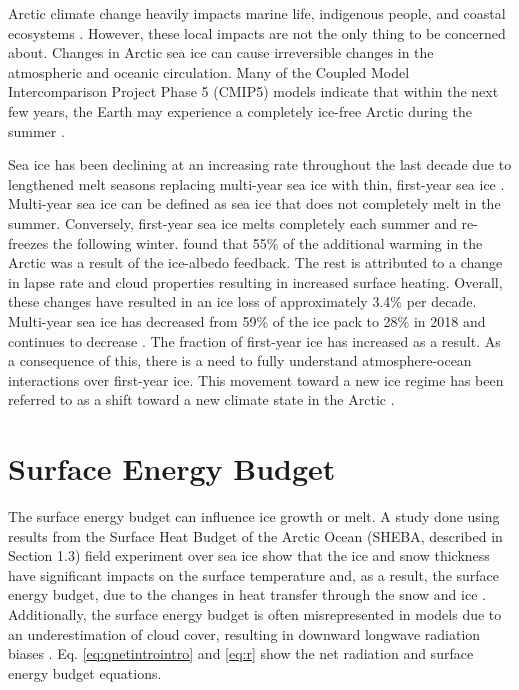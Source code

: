 Arctic climate change heavily impacts marine life, indigenous people, and coastal ecosystems \citep{ipcc_techsum}. However, these local impacts are not the only thing to be concerned about. Changes in Arctic sea ice can cause irreversible changes in the atmospheric and oceanic circulation. Many of the Coupled Model Intercomparison Project Phase 5 (CMIP5) models indicate that within the next few years, the Earth may experience a completely ice-free Arctic during the summer \citep{stroeve:2018}.

Sea ice has been declining at an increasing rate throughout the last decade due to lengthened melt seasons replacing multi-year sea ice  with thin, first-year sea ice \citep{meier:2014}. Multi-year sea ice can be defined as sea ice that does not completely melt in the summer. Conversely, first-year sea ice melts completely each summer and re-freezes the following winter. \citet{wunderling:2020} found that 55$\%$ of the additional warming in the Arctic was a result of the ice-albedo feedback. The rest is attributed to a change in lapse rate and cloud properties resulting in increased surface heating. Overall, these changes have resulted in an ice loss of approximately 3.4$\%$ per decade. Multi-year sea ice has decreased from 59$\%$ of the ice pack to 28$\%$ in 2018 and continues to decrease \citep{stroeve:2018}. The fraction of first-year ice has increased as a result. As a consequence of this, there is a need to fully understand atmosphere-ocean interactions over first-year ice. This movement toward a new ice regime has been referred to as a shift toward a new climate state in the Arctic \citep{verlinde:2007}. 

\section{Surface Energy Budget}
The surface energy budget can influence ice growth or melt. A study done using results from the Surface Heat Budget of the Arctic Ocean (SHEBA, described in Section 1.3) field experiment over sea ice show that the ice and snow thickness have significant impacts on the surface temperature and, as a result, the surface energy budget, due to the changes in heat transfer through the snow and ice \citep{hines:2015}. Additionally, the surface energy budget is often misrepresented in models due to an underestimation of cloud cover, resulting in downward longwave radiation biases \citep{inoue:2008}. Eq. \ref{eq:qnetintrointro} and \ref{eq:r} show the net radiation and surface energy budget equations.

